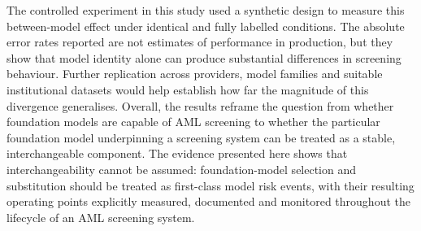 \documentclass[pdflatex,sn-basic,Numbered]{sn-jnl}
\begin{document}
The controlled experiment in this study used a synthetic design to measure this between-model effect under identical and fully labelled conditions. The absolute error rates reported are not estimates of performance in production, but they show that model identity alone can produce substantial differences in screening behaviour. Further replication across providers, model families and suitable institutional datasets would help establish how far the magnitude of this divergence generalises. Overall, the results reframe the question from whether foundation models are capable of AML screening to whether the particular foundation model underpinning a screening system can be treated as a stable, interchangeable component. The evidence presented here shows that interchangeability cannot be assumed: foundation-model selection and substitution should be treated as first-class model risk events, with their resulting operating points explicitly measured, documented and monitored throughout the lifecycle of an AML screening system.
\end{document}
